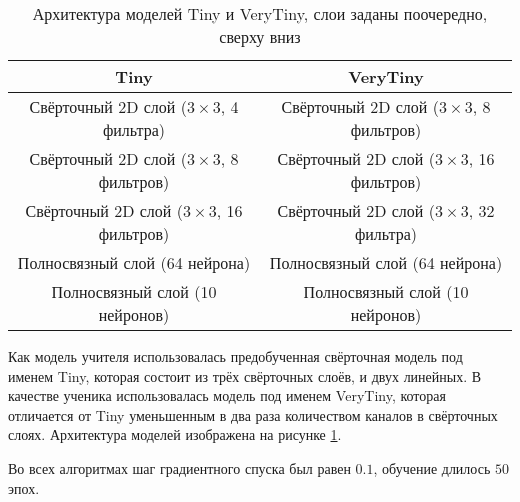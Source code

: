 \begin{table}[h!]
    \centering
    \begin{adjustbox}{max width=\textwidth}
        \begin{tabular}{|c|c|}
            \hline
            Tiny                                                  & VeryTiny                                              \\
            \hline \hline
            Свёрточный 2D слой \break ($3 \times 3$, 4 фильтра)   & Свёрточный 2D слой \break ($3 \times 3$, 8 фильтров)  \\ \hline
            Свёрточный 2D слой \break ($3 \times 3$, 8 фильтров)  & Свёрточный 2D слой \break ($3 \times 3$, 16 фильтров) \\ \hline
            Свёрточный 2D слой \break ($3 \times 3$, 16 фильтров) & Свёрточный 2D слой \break ($3 \times 3$, 32 фильтра)  \\ \hline
            Полносвязный слой  \break (64 нейрона)                & Полносвязный слой \break (64 нейрона)                 \\ \hline
            Полносвязный слой  \break (10 нейронов)               & Полносвязный слой \break (10 нейронов)                \\ \hline
        \end{tabular}
    \end{adjustbox}
    \caption{Архитектура моделей Tiny и VeryTiny, слои заданы поочередно, сверху вниз}
    \label{table:model_scheme}
\end{table}


Как модель учителя использовалась предобученная свёрточная модель под именем Tiny, которая состоит из трёх свёрточных слоёв, и двух линейных.
В качестве ученика использовалась модель под именем VeryTiny, которая отличается от Tiny уменьшенным в два раза количеством каналов в свёрточных слоях.
Архитектура моделей изображена на рисунке \ref{table:model_scheme}.

Во всех алгоритмах шаг градиентного спуска был равен $0.1$, обучение длилось $50$ эпох.


